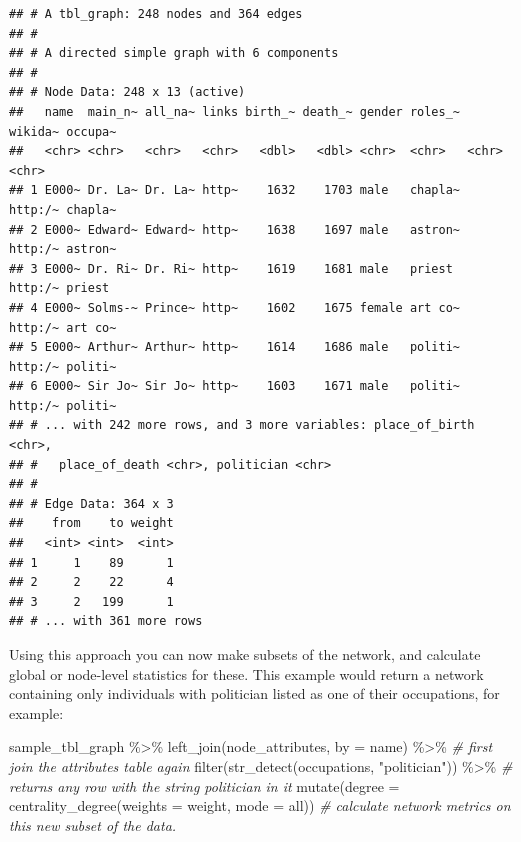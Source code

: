 \documentclass[
]{book}
\newenvironment{Shaded}{\begin{snugshade}}{\end{snugshade}}
\newcommand{\AttributeTok}[1]{\textcolor[rgb]{0.77,0.63,0.00}{#1}}
\newcommand{\CommentTok}[1]{\textcolor[rgb]{0.56,0.35,0.01}{\textit{#1}}}
\newcommand{\FunctionTok}[1]{\textcolor[rgb]{0.00,0.00,0.00}{#1}}
\newcommand{\NormalTok}[1]{#1}
\newcommand{\SpecialCharTok}[1]{\textcolor[rgb]{0.00,0.00,0.00}{#1}}
\newcommand{\StringTok}[1]{\textcolor[rgb]{0.31,0.60,0.02}{#1}}
\begin{document}
\begin{verbatim}
## # A tbl_graph: 248 nodes and 364 edges
## #
## # A directed simple graph with 6 components
## #
## # Node Data: 248 x 13 (active)
##   name  main_n~ all_na~ links birth_~ death_~ gender roles_~ wikida~ occupa~
##   <chr> <chr>   <chr>   <chr>   <dbl>   <dbl> <chr>  <chr>   <chr>   <chr>  
## 1 E000~ Dr. La~ Dr. La~ http~    1632    1703 male   chapla~ http:/~ chapla~
## 2 E000~ Edward~ Edward~ http~    1638    1697 male   astron~ http:/~ astron~
## 3 E000~ Dr. Ri~ Dr. Ri~ http~    1619    1681 male   priest  http:/~ priest 
## 4 E000~ Solms-~ Prince~ http~    1602    1675 female art co~ http:/~ art co~
## 5 E000~ Arthur~ Arthur~ http~    1614    1686 male   politi~ http:/~ politi~
## 6 E000~ Sir Jo~ Sir Jo~ http~    1603    1671 male   politi~ http:/~ politi~
## # ... with 242 more rows, and 3 more variables: place_of_birth <chr>,
## #   place_of_death <chr>, politician <chr>
## #
## # Edge Data: 364 x 3
##    from    to weight
##   <int> <int>  <int>
## 1     1    89      1
## 2     2    22      4
## 3     2   199      1
## # ... with 361 more rows
\end{verbatim}

Using this approach you can now make subsets of the network, and calculate global or node-level statistics for these. This example would return a network containing only individuals with politician listed as one of their occupations, for example:

\begin{Shaded}
\begin{Highlighting}[]
\NormalTok{sample\_tbl\_graph }\SpecialCharTok{\%\textgreater{}\%} 
  \FunctionTok{left\_join}\NormalTok{(node\_attributes, }\AttributeTok{by =} \StringTok{\textquotesingle{}name\textquotesingle{}}\NormalTok{) }\SpecialCharTok{\%\textgreater{}\%} \CommentTok{\# first join the attributes table again}
  \FunctionTok{filter}\NormalTok{(}\FunctionTok{str\_detect}\NormalTok{(occupations, }\StringTok{"politician"}\NormalTok{)) }\SpecialCharTok{\%\textgreater{}\%} \CommentTok{\# returns any row with the string \textquotesingle{}politician\textquotesingle{} in it}
  \FunctionTok{mutate}\NormalTok{(}\AttributeTok{degree =} \FunctionTok{centrality\_degree}\NormalTok{(}\AttributeTok{weights =}\NormalTok{ weight, }\AttributeTok{mode =} \StringTok{\textquotesingle{}all\textquotesingle{}}\NormalTok{)) }\CommentTok{\# calculate network metrics on this new subset of the data.}
\end{Highlighting}
\end{Shaded}
\end{document}
